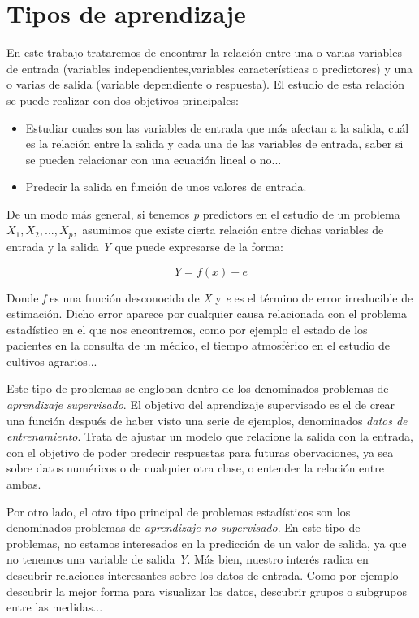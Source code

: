 \documentclass[12pt,a4paper,Spanish]{book}
\begin{document}
\chapter{Tipos de aprendizaje}

En este trabajo trataremos de encontrar la relación entre una o varias variables de entrada (variables independientes,variables características o predictores) y una o varias de salida (variable dependiente o respuesta). El estudio de esta relación se puede realizar con dos objetivos principales:


\begin{itemize}
\item Estudiar cuales son las variables de entrada que más afectan a la salida, cuál es la relación entre la salida y cada una de las variables de entrada, saber si se pueden relacionar con una ecuación lineal o no... 

\item Predecir la salida en función de unos valores de entrada.
\end{itemize}

De un modo más general, si tenemos \textit{p} predictors en el estudio de un problema  
$X_1,X_2,...,X_p,$ asumimos que existe cierta relación entre dichas variables de entrada y la salida \textit{Y} que puede expresarse de la forma:

\begin{equation}
Y=f(x)+e
\end{equation}

Donde \textit{f} es una función desconocida de \textit{X} y \textit{e} es el término de error irreducible de estimación. Dicho error aparece por cualquier causa relacionada con el problema estadístico en el que nos encontremos, como por ejemplo el estado de los pacientes en la consulta de un médico, el tiempo atmosférico en el estudio de cultivos agrarios...

Este tipo de problemas se engloban dentro de los denominados problemas de \textit{aprendizaje supervisado}. El objetivo del aprendizaje supervisado es el de crear una función después de haber visto una serie de ejemplos, denominados \textit{datos de entrenamiento}. Trata de ajustar un modelo que relacione la salida con la entrada, con el objetivo de poder predecir respuestas para futuras obervaciones, ya sea sobre datos numéricos o de cualquier otra clase, o entender la relación entre ambas.

Por otro lado, el otro tipo principal de problemas estadísticos son los denominados problemas de \textit{aprendizaje no supervisado}. En este tipo de problemas, no estamos interesados en la predicción de un valor de salida, ya que no tenemos una variable de salida \textit{Y}. Más bien, nuestro interés radica en descubrir relaciones interesantes sobre los datos de entrada. Como por ejemplo descubrir la mejor forma para visualizar los datos, descubrir grupos o subgrupos entre las medidas...
\end{document}
